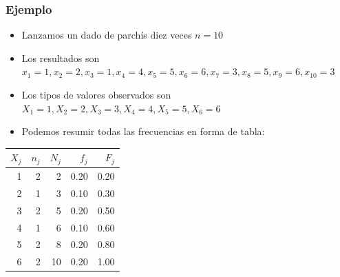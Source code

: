 \begin{frame}[fragile]
\frametitle{Ejemplo}

\begin{itemize}
\item Lanzamos un dado de parchís  diez veces  $n=10$
\item Los resultados son $x_1=1,x_2=2,x_3=1,x_4=4,x_5=5,x_6=6,x_7=3,x_8=5,x_9=6,x_{10}=3$
\item Los tipos de valores observados son $X_1=1,X_2=2,X_3=3,X_4=4,X_5=5,X_6=6$
\item Podemos resumir todas las frecuencias en  forma de tabla:
\end{itemize}
\begin{table}[ht]
\begin{center}
\begin{tabular}{rrrrr}
  \hline
 $X_j$ & $n_j$ & $N_j$ & $f_j$ & $F_j$ \\ 
  \hline
1 &   2 &   2 & 0.20 & 0.20 \\ 
  2 &   1 &   3 & 0.10 & 0.30 \\ 
  3 &   2 &   5 & 0.20 & 0.50 \\ 
  4 &   1 &   6 & 0.10 & 0.60 \\ 
  5 &   2 &   8 & 0.20 & 0.80 \\ 
  6 &   2 &  10 & 0.20 & 1.00 \\ 
   \hline
\end{tabular}
\end{center}
\end{table}
\end{frame}







